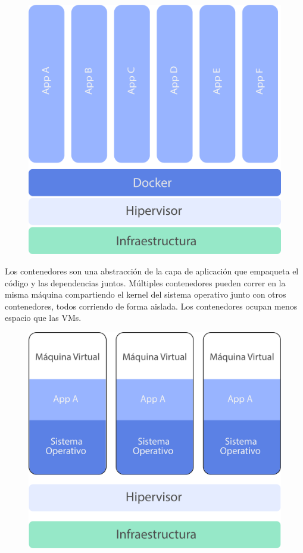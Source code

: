 \begin{figure}[h!]
  \centering
    \includegraphics[scale=0.7]{images/containers.png}
  \label{fig:contvm}
\end{figure}

\break

Los contenedores son una abstracción de la capa de aplicación que empaqueta el código y las dependencias juntos. Múltiples contenedores pueden correr en la misma máquina compartiendo el kernel del sistema operativo junto con otros contenedores, todos corriendo de forma aislada. Los contenedores ocupan menos espacio que las VMs.

\begin{figure}[h!]
  \centering
    \includegraphics[scale=0.7]{images/vms.png}
  \label{fig:vm}
\end{figure}

